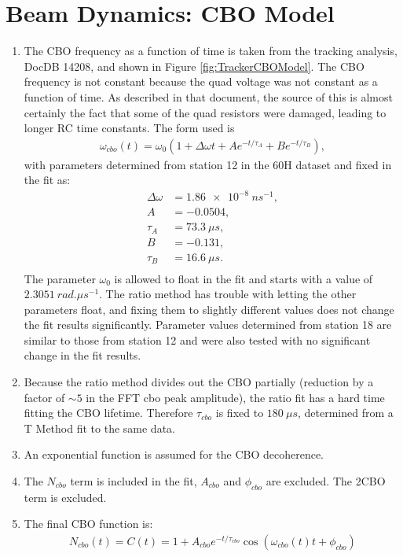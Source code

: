 \section{Beam Dynamics: CBO Model}
\label{Sec:CBO}

	\begin{enumerate}
		\item{The CBO frequency as a function of time is taken from the tracking analysis, DocDB 14208, and shown in Figure \ref{fig:TrackerCBOModel}. The CBO frequency is not constant because the quad voltage was not constant as a function of time. As described in that document, the source of this is almost certainly the fact that some of the quad resistors were damaged, leading to longer RC time constants. The form used is 
			\begin{gather}
				\omega_{cbo}(t) = \omega_{0}(1 + \Delta\omega t + A e^{-t/\tau_{A}} + B e^{-t/\tau_{B}}),
			\label{Eqn:CBOFreq}
			\end{gather}
		with parameters determined from station 12 in the 60H dataset and fixed in the fit as:
			\begin{equation*}	
			\begin{aligned}
			 	\Delta\omega &= \SI{1.86e-8}{ns^{-1}}, \\
			 	A &= -0.0504, \\
			 	\tau_{A} &= \SI{73.3}{\mu s}, \\
			 	B &= -0.131, \\
			 	\tau_{B} &= \SI{16.6}{\mu s}. \\
			\end{aligned}
			\end{equation*}
		The parameter $\omega_{0}$ is allowed to float in the fit and starts with a value of $\SI{2.3051}{rad.\mu s^{-1}}$. The ratio method has trouble with letting the other parameters float, and fixing them to slightly different values does not change the fit results significantly. Parameter values determined from station 18 are similar to those from station 12 and were also tested with no significant change in the fit results.}
		\item{Because the ratio method divides out the CBO partially (reduction by a factor of $\sim5$ in the FFT cbo peak amplitude), the ratio fit has a hard time fitting the CBO lifetime. Therefore $\tau_{cbo}$ is fixed to $\SI{180}{\mu s}$, determined from a T Method fit to the same data.}
		\item{An exponential function is assumed for the CBO decoherence.}
		\item{The $N_{cbo}$ term is included in the fit, $A_{cbo}$ and $\phi_{cbo}$ are excluded. The 2CBO term is excluded.}
		\item{The final CBO function is:
			\begin{gather}
					N_{cbo}(t) = C(t) = 1 + A_{cbo} e^{-t/\tau_{cbo}} \cos(\omega_{cbo}(t)t + \phi_{cbo})
			\label{eqn:CBO}
			\end{gather}
		}
	\end{enumerate}

